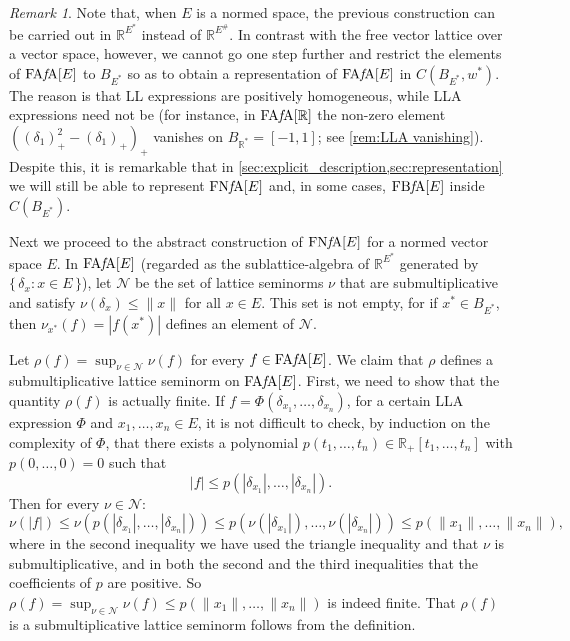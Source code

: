 \documentclass{memo-l}
\theoremstyle{definition}
\theoremstyle{remark}
\newtheorem{rem}[theorem]{Remark}
\numberwithin{section}{chapter}
\numberwithin{equation}{chapter}
\newcommand\R{\ensuremath{\mathbb{R}}}
\newcommand{\FAFAv}[1]{\operatorname{FA{\it f}\!A}[#1]}
\newcommand{\FNFA}[1]{\operatorname{FN{\it f}\!A}[#1]}
\newcommand{\FBFA}[1]{\operatorname{FB{\it f}\!A}[#1]}
\begin{document}
\begin{rem}\label{rem:not_injective}
    Note that, when $E$ is a normed space, the previous construction can
    be carried out in $\R^{E^{*}}$ instead of $\R^{E^{\#}}$. In
    contrast with the free vector lattice over a vector
    space, however, we cannot go one step further and
    restrict the elements of $\FAFAv E$ to $B_{E^{*}}$ so as to obtain
    a representation of $\FAFAv E$ in $C(B_{E^{*}},w^{*})$. The reason
    is that LL expressions are positively homogeneous, while
    LLA expressions need not be (for instance, in $\FAFAv \R$ the
    non-zero element $((\delta _1)_+^2-(\delta _1)_+)_+$ vanishes on
    $B_{\R^{*}}=[-1,1]$; see \cref{rem:LLA vanishing}). Despite
    this, it is remarkable that in
    \cref{sec:explicit_description,sec:representation} we will still
    be able to represent $\FNFA E$ and, in some cases, $\FBFA E$
    inside $C(B_{E^{*}})$.
\end{rem}

Next we proceed to the abstract construction of $\FNFA E$ for a normed
vector space $E$. In $\FAFAv E$ (regarded as the sublattice-algebra of
$\R^{E^{*}}$ generated by $\{\, \delta_x : x \in E\,\}$), let $\mathcal{N}$ be the set
of lattice seminorms $\nu $ that are submultiplicative and satisfy $\nu (\delta _x)\le \|x\|$ for all $x \in E$. This set is not empty,
for if $x^{*} \in B_{E^{*}}$,
then $\nu _{x^{*}}(f)=|f(x^{*})|$ defines an element of
$\mathcal{N}$.

Let $\rho (f)=\sup_{\nu \in \mathcal{N}}\nu (f)$ for every $f \in \FAFAv E$. We claim
that $\rho $ defines a submultiplicative lattice seminorm on $\FAFAv E$.
First, we need to show that the quantity $\rho (f)$ is actually finite.
If $f=\Phi (\delta _{x_1},\ldots ,\delta _{x_n})$, for a certain
LLA expression $\Phi$ and $x_1,\ldots ,x_n \in E$, it is not difficult
to check, by induction on the complexity of $\Phi $, that there exists
a polynomial $p(t_1,\ldots ,t_n)\in \R_+[t_1,\ldots ,t_n]$ with
$p(0,\ldots ,0)=0$ such that
\begin{equation}\label{eq:polynomial_bound}
|f|\le p(|\delta _{x_1}|,\ldots ,|\delta _{x_n}|).
\end{equation}
Then for every $\nu \in \mathcal{N}$:
\[
\nu (|f|)\le \nu (p(|\delta _{x_1}|,\ldots ,|\delta _{x_n}|))\le p(
\nu (|\delta _{x_1}|),\ldots ,\nu (|\delta _{x_n}|))\le p(\|x_1\|,\ldots
,\|x_n\|),
\]
where in the second inequality we have used the triangle inequality
and that $\nu $ is
submultiplicative, and in both the second and the third inequalities
that the coefficients of $p$ are positive. So $\rho (f)=\sup_{\nu \in
\mathcal{N}}\nu (f) \le p(\|x_1\|,\ldots
,\|x_n\|)$ is indeed finite. That $\rho (f)$ is a submultiplicative
lattice seminorm follows from the definition.
\end{document}
